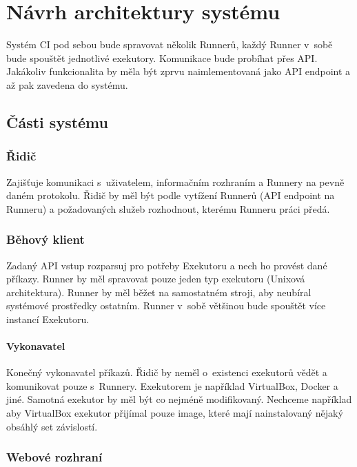 \chapter{Návrh architektury systému}

Systém CI pod sebou bude spravovat několik Runnerů, každý Runner v~sobě bude spouštět jednotlivé exekutory.
Komunikace bude probíhat přes API.
Jakákoliv funkcionalita by měla být zprvu naimlementovaná jako API endpoint a až pak zavedena do systému.

\section{Části systému}


\subsection{Řidič}

Zajišťuje komunikaci s~uživatelem, informačním rozhraním a Runnery na pevně daném protokolu.
Řidič by měl být podle vytížení Runnerů (API endpoint na Runneru) a požadovaných služeb rozhodnout, kterému Runneru práci předá.

\subsection{Běhový klient}

Zadaný API vstup rozparsuj pro potřeby Exekutoru a nech ho provést dané příkazy.
Runner by měl spravovat pouze jeden typ exekutoru (Unixová architektura).
Runner by měl běžet na samostatném stroji, aby neubíral systémové prostředky ostatním.
Runner v~sobě většinou bude spouštět více instancí Exekutoru.

\subsubsection{Vykonavatel}

Konečný vykonavatel příkazů. Řidič by neměl o~existenci exekutorů vědět a komunikovat pouze s~Runnery.
Exekutorem je například VirtualBox, Docker a jiné.
Samotná exekutor by měl být co nejméně modifikovaný.
Nechceme například aby VirtualBox exekutor přijímal pouze image, které mají nainstalovaný nějaký obsáhlý set závislostí.

\subsection{Webové rozhraní}

